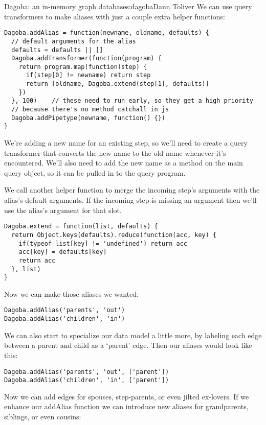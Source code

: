 \begin{aosachapter}{Dagoba: an in-memory graph database}{s:dagoba}{Dann Toliver}
We can use query transformers to make aliases with just a couple extra
helper functions:

\begin{verbatim}
Dagoba.addAlias = function(newname, oldname, defaults) {
  // default arguments for the alias
  defaults = defaults || []                             
  Dagoba.addTransformer(function(program) {
    return program.map(function(step) {
      if(step[0] != newname) return step
      return [oldname, Dagoba.extend(step[1], defaults)]
    })
  }, 100)    // these need to run early, so they get a high priority
  // because there's no method catchall in js
  Dagoba.addPipetype(newname, function() {})            
}
\end{verbatim}

We're adding a new name for an existing step, so we'll need to create a
query transformer that converts the new name to the old name whenever
it's encountered. We'll also need to add the new name as a method on the
main query object, so it can be pulled in to the query program.

We call another helper function to merge the incoming step's arguments
with the alias's default arguments. If the incoming step is missing an
argument then we'll use the alias's argument for that slot.

\begin{verbatim}
Dagoba.extend = function(list, defaults) {
  return Object.keys(defaults).reduce(function(acc, key) {
    if(typeof list[key] != 'undefined') return acc
    acc[key] = defaults[key]
    return acc
  }, list)
}
\end{verbatim}

Now we can make those aliases we wanted:

\begin{verbatim}
Dagoba.addAlias('parents', 'out')
Dagoba.addAlias('children', 'in')
\end{verbatim}

We can also start to specialize our data model a little more, by
labeling each edge between a parent and child as a `parent' edge. Then
our aliases would look like this:

\begin{verbatim}
Dagoba.addAlias('parents', 'out', ['parent'])
Dagoba.addAlias('children', 'in', ['parent'])
\end{verbatim}

Now we can add edges for spouses, step-parents, or even jilted
ex-lovers. If we enhance our addAlias function we can introduce new
aliases for grandparents, siblings, or even cousins:


\end{aosachapter}
